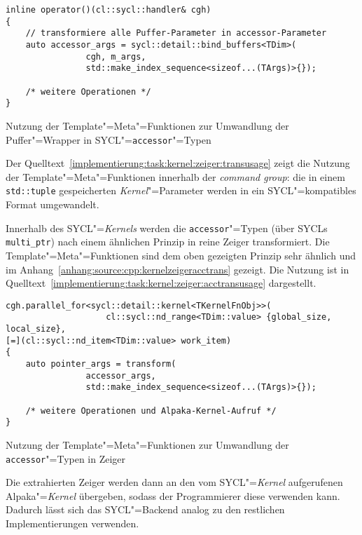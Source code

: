 \begin{code}
    \begin{verbatim}
inline operator()(cl::sycl::handler& cgh)
{
    // transformiere alle Puffer-Parameter in accessor-Parameter
    auto accessor_args = sycl::detail::bind_buffers<TDim>(
                cgh, m_args,
                std::make_index_sequence<sizeof...(TArgs)>{});

    /* weitere Operationen */
}
    \end{verbatim}
    \caption{Nutzung der Template"=Meta"=Funktionen zur Umwandlung der
             Puffer"=Wrapper in SYCL"=\texttt{accessor}"=Typen}
    \label{implementierung:task:kernel:zeiger:transusage}
\end{code}

Der Quelltext~\ref{implementierung:task:kernel:zeiger:transusage} zeigt die
Nutzung der Template"=Meta"=Funktionen innerhalb der \textit{command group}:
die in einem \texttt{std::tuple} gespeicherten \textit{Kernel}"=Parameter werden in ein
SYCL"=kompatibles Format umgewandelt.

Innerhalb des SYCL"=\textit{Kernels} werden die \texttt{accessor}"=Typen (über SYCLs
\texttt{multi\_ptr}) nach einem ähnlichen Prinzip in reine Zeiger transformiert.
Die Template"=Meta"=Funktionen sind dem oben gezeigten Prinzip sehr ähnlich
und im Anhang~\ref{anhang:source:cpp:kernelzeigeracctrans} gezeigt. Die Nutzung
ist in Quelltext~\ref{implementierung:task:kernel:zeiger:acctransusage}
dargestellt.

\begin{code}
    \begin{verbatim}
cgh.parallel_for<sycl::detail::kernel<TKernelFnObj>>(
                    cl::sycl::nd_range<TDim::value> {global_size, local_size},
[=](cl::sycl::nd_item<TDim::value> work_item)
{
    auto pointer_args = transform(
                accessor_args,
                std::make_index_sequence<sizeof...(TArgs)>{});

    /* weitere Operationen und Alpaka-Kernel-Aufruf */
}
    \end{verbatim}
    \caption{Nutzung der Template"=Meta"=Funktionen zur Umwandlung der
             \texttt{accessor}"=Typen in Zeiger}
    \label{implementierung:task:kernel:zeiger:acctransusage}
\end{code}

Die extrahierten Zeiger werden dann an den vom SYCL"=\textit{Kernel} aufgerufenen
Alpaka"=\textit{Kernel} übergeben, sodass der Programmierer diese verwenden kann.
Dadurch lässt sich das SYCL"=Backend analog zu den restlichen Implementierungen
verwenden.

